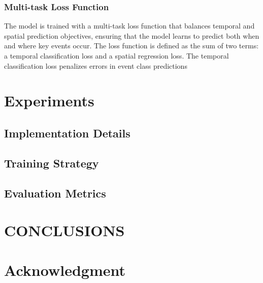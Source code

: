 \documentclass[conference]{IEEEtran}
\begin{document}
\subsubsection{Multi-task Loss Function}
The model is trained with a multi-task loss function that balances temporal and spatial prediction objectives, ensuring that the model learns to predict both when and where key events occur. The loss function is defined as the sum of two terms: a temporal classification loss and a spatial regression loss. The temporal classification loss penalizes errors in event class predictions


\section{Experiments}
\subsection{Implementation Details}
\subsection{Training Strategy}
\subsection{Evaluation Metrics}

\section{CONCLUSIONS}
\section*{Acknowledgment}



\end{document}
